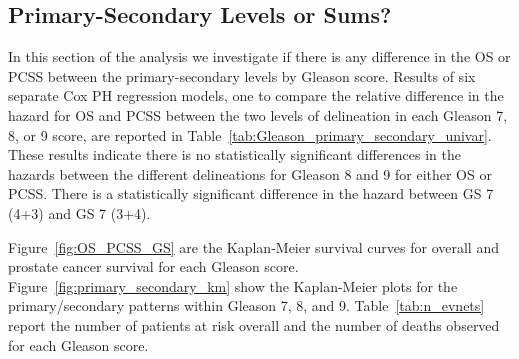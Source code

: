 \subsection{Primary-Secondary Levels or Sums?}
In this section of the analysis we investigate if there is any difference in the
OS or PCSS between the primary-secondary levels by Gleason score.
Results of six separate Cox PH regression models, one to compare the
relative difference in the hazard for OS and PCSS between the two levels of
delineation in each Gleason 7, 8, or 9 score,  are reported in
Table~\ref{tab:Gleason_primary_secondary_univar}.    These results indicate
there is no statistically significant differences in the hazards between the
different delineations for Gleason 8 and 9 for either OS or PCSS.  There is a
statistically significant difference in the hazard between GS 7 (4+3) and GS 7
(3+4).

Figure~\ref{fig:OS_PCSS_GS} are the Kaplan-Meier survival curves for overall and
prostate cancer survival for each Gleason score.
Figure~\ref{fig:primary_secondary_km} show the Kaplan-Meier plots for the
primary/secondary patterns within Gleason 7, 8, and 9.  Table~\ref{tab:n_evnets}
report the number of patients at risk overall and the number of deaths observed
for each Gleason score.





